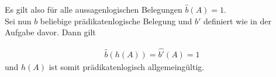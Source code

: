 
\begin{solution}

Es gilt also für alle aussagenlogischen Belegungen $\hat{b}(A) = 1$. \\
Sei nun $b$ beliebige prädikatenlogische Belegung und $b'$ definiert wie
in der Aufgabe davor. Dann gilt

\begin{align*}
  \hat{b}(h(A)) = \hat{b'}(A) = 1
\end{align*}
und $h(A)$ ist somit prädikatenlogisch allgemeingültig.

\end{solution}

